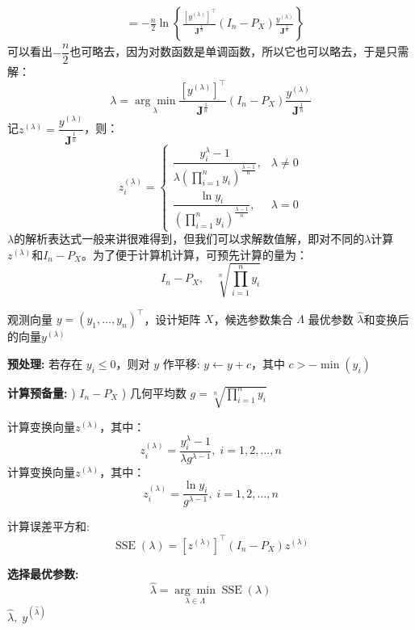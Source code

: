 \begin{note}
\begin{align*}
		&=-\frac{n}{2}\ln\left\{\frac{[y^{(\lambda)}]^{\top}}{\mathbf{J}^{\frac{1}{n}}}(I_n-P_X)\frac{y^{(\lambda)}}{\mathbf{J}^{\frac{1}{n}}}\right\}
	\end{align*}
	可以看出$-\dfrac{n}{2}$也可略去，因为对数函数是单调函数，所以它也可以略去，于是只需解：
	\begin{equation*}
		\lambda=\underset{\lambda}{\arg\min}\frac{[y^{(\lambda)}]^{\top}}{\mathbf{J}^{\frac{1}{n}}}(I_n-P_X)\frac{y^{(\lambda)}}{\mathbf{J}^{\frac{1}{n}}}
	\end{equation*}
	记$z^{(\lambda)}=\dfrac{y^{(\lambda)}}{\mathbf{J}^{\frac{1}{n}}}$，则：
	\begin{equation*}
		z_i^{(\lambda)}=
		\begin{cases}
			\dfrac{y_i^{\lambda}-1}{\lambda\left(\prod\limits_{i=1}^{n}y_i\right)^{\frac{\lambda-1}{n}}},&\lambda\ne0 \\
			\dfrac{\ln y_i}{\left(\prod\limits_{i=1}^{n}y_i\right)^{\frac{\lambda-1}{n}}},&\lambda=0
		\end{cases}
	\end{equation*}
	$\lambda$的解析表达式一般来讲很难得到，但我们可以求解数值解，即对不同的$\lambda$计算$z^{(\lambda)}$和$I_n-P_X$。为了便于计算机计算，可预先计算的量为：
	\begin{equation*}
		I_n-P_X,\quad\sqrt[n]{\prod\limits_{i=1}^{n}y_i}
	\end{equation*}
\end{note}
\begin{algorithm}[H]
	\caption{Box-Cox 变换的计算机求解}
	\label{alg:BoxCox}
	\begin{algorithmic}[1]
		\Require 观测向量 $y = (y_1,\dots,y_n)^{\top}$，设计矩阵 $X$，候选参数集合 $\Lambda$
		\Ensure 最优参数 $\hat{\lambda}$和变换后的向量$y^{(\lambda)}$
		
		\State \textbf{预处理:} 若存在 $y_i \le 0$，则对 $y$ 作平移: $y \gets y + c$，其中 $c > -\min(y_i)$
		
		\State \textbf{计算预备量:} 
		\Statex {}) $I_n - P_X$
		\Statex {}) 几何平均数 $g = \sqrt[n]{\prod\limits_{i=1}^n y_i}$
		
		\For{$\lambda \in \Lambda$}
		\State 计算变换向量$z^{(\lambda)}$，其中：
		\begin{equation*}
			z_i^{(\lambda)}=\dfrac{y_i^\lambda-1}{\lambda g^{\lambda-1}},\;i=1,2,\dots,n
		\end{equation*}
		\Else
		\State 计算变换向量$z^{(\lambda)}$，其中：
		\begin{equation*}
			z_i^{(\lambda)}=\dfrac{\ln y_i}{g^{\lambda-1}},\;i=1,2,\dots,n
		\end{equation*}
		\EndIf
		
		\State 计算误差平方和:
		\[
		\operatorname{SSE}(\lambda) = [z^{(\lambda)}]^{\top} (I_n - P_X) z^{(\lambda)}
		\]
		\EndFor
		
		\State \textbf{选择最优参数:}
		\[
		\hat{\lambda} = \underset{\lambda \in \Lambda}{\arg\min}\operatorname{SSE}(\lambda)
		\]
		\State \Return $\hat{\lambda}, \; y^{(\hat{\lambda})}$
	\end{algorithmic}
\end{algorithm}
